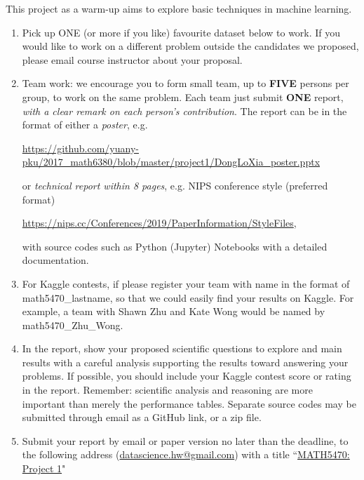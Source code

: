 \documentclass[11pt]{article}
\begin{document}
This project as a warm-up aims to explore basic techniques in machine learning.
\begin{enumerate}
\item Pick up ONE (or more if you like) favourite dataset below to work. If you would like to work on a different problem outside the candidates we proposed, please email course instructor about your proposal.  
\item Team work: we encourage you to form small team, up to {\bf FIVE} persons per group, to work on the same problem. Each team just submit {\bf ONE} report, \emph{with a clear remark on each person's contribution}. The report can be in the format of either a \emph{poster}, e.g. 
\begin{center}%
\url{https://github.com/yuany-pku/2017_math6380/blob/master/project1/DongLoXia_poster.pptx}
\end{center}
or \emph{technical report within 8 pages}, e.g. NIPS conference style (preferred format) 
\begin{center}
\url{https://nips.cc/Conferences/2019/PaperInformation/StyleFiles}, 
\end{center}
with source codes such as Python (Jupyter) Notebooks with a detailed documentation.
\item For Kaggle contests, if please register your team with name in the format of math5470\_lastname, so that we could easily find your results on Kaggle. For example, a team with Shawn Zhu and Kate Wong would be named by math5470\_Zhu\_Wong.

\item In the report, show your proposed scientific questions to explore and main results with a careful analysis supporting the results toward answering your problems. If possible, you should include your Kaggle contest score or rating in the report. Remember: scientific analysis and reasoning are more important than merely the performance tables. Separate source codes may be submitted through email as a GitHub link, or a zip file.    
\item Submit your report by email or paper version no later than the deadline, to the following address  (\href{mailto:datascience.hw@gmail.com}{datascience.hw@gmail.com}) with a title ``\underline{MATH5470: Project 1}" %


\end{enumerate}
\end{document}
